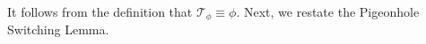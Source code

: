 \documentclass[11pt]{article}
\newtheorem{definition}{Definition}
\newcommand{\todo}[1]{\textcolor{red}{TODO: #1}}
\newcommand{\nodes}{\mathrm{nodes}}
\begin{document}

\medskip
It follows from the definition that $\mathcal{T}_{\phi} \equiv \phi$. 
Next, we restate the Pigeonhole Switching Lemma.

\medskip
\end{document}
